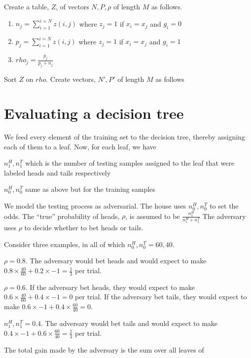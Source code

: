 Create a table, \(Z\), of vectors \(N, P, \rho\) of length \(M\) as follows.  
\begin{enumerate}
\item 
\(n_j = \sum_{i=1}^{i=N} z(i, j)\) where 
\(z_j = 1 \) if \(x_i = x_j \) and \(g_i = 0\)
\item 
\(p_j = \sum_{i=1}^{i=N} z(i, j)\) where 
\(z_j = 1 \) if \(x_i = x_j \) and \(g_i = 1\)
\item 
\(rho_j = \frac{p_j}{p_j+n_j}\)
\end{enumerate}
Sort \(Z\) on \(rho\). Create vectors, \(N', P'\) of length \(M\) as follows
\be
\item 
\ee

\section{Evaluating a decision tree}
We feed every element of the training set to the decision tree, thereby
assigning each of them to a leaf. Now, for each leaf, we have
\be
\item \(n^H_1, n^T_1\) which is the number of testing samples assigned 
to the leaf that were labeled heads and tails respectively
\item \(n^H_0, n^T_0\) same as above but for the training samples
\ee

We model the testing process as adversarial. The house uses 
\(n^H_0, n^T_0\) to set the odds.
The ``true'' probability of heads, \(\rho\), is assumed to be 
\(\frac{n^H_1}{n^H_1+ n^T_1}\) 
The adversary uses \(\rho\) to 
decide whether to bet heads or tails.

Consider three examples, in all of which \(n^H_0, n^T_0 = 60, 40\).
\be
\item \(\rho = 0.8\). The adversary would bet heads and would
expect to make \(0.8 \times \frac{40}{60} + 0.2 \times -1 = \frac{1}{3}\) per
trial.
\item \(\rho = 0.6\). If the adversary bet heads, they would
expect to make \(0.6 \times \frac{40}{60} + 0.4 \times -1 = 0\) per
trial.
If the adversary bet tails, they would
expect to make \(0.6 \times -1 + 0.4 \times \frac{60}{40} = 0\).
\item \(n^H_1, n^T_1 = 0.4\). The adversary would bet tails and would
expect to make \(0.4 \times -1 + 0.6 \times \frac{60}{40} = \frac{1}{3}\) per
trial.
\ee

The total gain made by the adversary is the sum over all leaves of 




